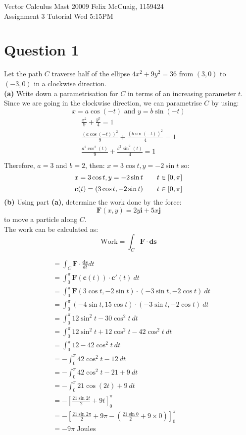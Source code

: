 \documentclass[12pt]{article}
\newcommand{\vect}[1]{\boldsymbol{#1}}
\begin{document}
Vector Calculus Mast 20009 \hfill Felix McCuaig, 1159424 \\
Assignment 3 \hfill Tutorial Wed 5:15PM  

\section*{Question 1}
Let the path $C$ traverse half of the ellipse $4x^2+9y^2=36$ from $(3,0)$ to $(-3,0)$ in a clockwise direction. \\
\medskip
\textbf{(a)} Write down a parametrisation for $C$ in terms of an increasing parameter $t$. \\
\smallskip
Since we are going in the clockwise direction, we can parametrise $C$ by using:
$$
x=a\cos ( -t) \text{ and } y=b\sin (-t)
$$
\begin{align*}
	\frac{x^2}{9}+\frac{y^2}{4}=1 \\
	\frac{(a\cos (-t))^2}{9}+\frac{(b\sin (-t))^2}{4}=1 \\
	\frac{a^2\cos^2 (t)}{9}+\frac{b^2\sin^2 (t)}{4}=1 \\
\end{align*}
Therefore, $a = 3$ and $b = 2$, then: $x = 3 \cos t, y = -2 \sin t$ so:
$$
	x = 3 \cos t, y = -2 \sin t \hspace{20px} t \in [ 0, \pi ]
$$
$$
	\vect{c}(t) = (3 \cos t, -2 \sin t) \hspace{20px} t \in [ 0, \pi ]
$$
\textbf{(b)} Using part \textbf{(a)}, determine the work done by the force: \\
$$
	\vect{F}(x, y) = 2y\vect{i}+ 5x\vect{j}
$$
to move a particle along $C$. \\
\medskip
The work can be calculated as:
$$
\text{Work} = \int_{C}\vect{F}  \cdot \vect{ds}
$$

\begin{align*}
	&=\int_{C}\vect{F}\cdot \frac{\vect{ds}}{dt}dt \\
	&=\int_{0}^{\pi} \vect{F}(\vect{c}(t))\cdot \vect{c}'(t) \ dt \\
	&=\int_{0}^{\pi} \vect{F}(3 \cos t, -2 \sin t)\cdot (-3 \sin t, -2 \cos t) \ dt \\
	&=\int_{0}^{\pi} (-4 \sin t, 15 \cos t)\cdot (-3 \sin t, -2 \cos t) \ dt \\
	&=\int_{0}^{\pi} 12 \sin^2 t - 30 \cos^2 t \ dt \\
	&=\int_{0}^{\pi} 12 \sin^2 t + 12 \cos^2 t - 42 \cos^2 t \ dt \\
	&=\int_{0}^{\pi} 12 - 42 \cos^2 t \ dt \\
	&=-\int_{0}^{\pi} 42 \cos^2 t - 12 \ dt \\
	&=-\int_{0}^{\pi} 42 \cos^2 t - 21 + 9 \ dt \\
	&=-\int_{0}^{\pi} 21\cos(2t) + 9 \ dt \\
	&=-\left[ \frac{21 \sin 2t }{2} + 9t \right]^{\pi}_{0} \\
	&=-\left[ \frac{21 \sin 2\pi }{2} + 9\pi - \left( \frac{21 \sin 0 }{2} + 9\times0 \right) \right]^{\pi}_{0} \\
	&=-9\pi \text{ Joules} \\
\end{align*}
\end{document}
